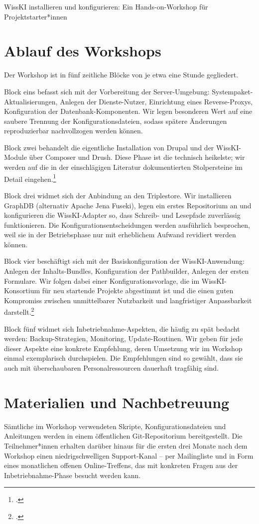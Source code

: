 \begin{beitrag}{WissKI installieren und konfigurieren: Ein Hands-on-Workshop für Projektstarter*innen}
\section{Ablauf des Workshops}
Der Workshop ist in fünf zeitliche Blöcke von je etwa eine Stunde gegliedert.

Block eins befasst sich mit der Vorbereitung der Server-Umgebung: Systempaket-Aktualisierungen, Anlegen der Dienste-Nutzer, Einrichtung eines Reverse-Proxys, Konfiguration der Datenbank-Komponenten. Wir legen besonderen Wert auf eine saubere Trennung der Konfigurationsdateien, sodass spätere Änderungen reproduzierbar nachvollzogen werden können.

Block zwei behandelt die eigentliche Installation von Drupal und der WissKI-Module über Composer und Drush. Diese Phase ist die technisch heikelste; wir werden auf die in der einschlägigen Literatur dokumentierten Stolpersteine im Detail eingehen.\footcite[48]{pohl2024-installation-leitfaden}

Block drei widmet sich der Anbindung an den Triplestore. Wir installieren GraphDB (alternativ Apache Jena Fuseki), legen ein erstes Repositorium an und konfigurieren die WissKI-Adapter so, dass Schreib- und Lesepfade zuverlässig funktionieren. Die Konfigurationsentscheidungen werden ausführlich besprochen, weil sie in der Betriebsphase nur mit erheblichem Aufwand revidiert werden können.

Block vier beschäftigt sich mit der Basiskonfiguration der WissKI-Anwendung: Anlegen der Inhalts-Bundles, Konfiguration der Pathbuilder, Anlegen der ersten Formulare. Wir folgen dabei einer Konfigurationsvorlage, die im WissKI-Konsortium für neu startende Projekte abgestimmt ist und die einen guten Kompromiss zwischen unmittelbarer Nutzbarkeit und langfristiger Anpassbarkeit darstellt.\footcite[vgl.][]{braun2024-konfigurationsvorlage}

Block fünf widmet sich Inbetriebnahme-Aspekten, die häufig zu spät bedacht werden: Backup-Strategien, Monitoring, Update-Routinen. Wir geben für jede dieser Aspekte eine konkrete Empfehlung, deren Umsetzung wir im Workshop einmal exemplarisch durchspielen. Die Empfehlungen sind so gewählt, dass sie auch mit überschaubaren Personalressourcen dauerhaft tragfähig sind.

\section{Materialien und Nachbetreuung}
Sämtliche im Workshop verwendeten Skripte, Konfigurationsdateien und Anleitungen werden in einem öffentlichen Git-Repositorium bereitgestellt. Die Teilnehmer*innen erhalten darüber hinaus für die ersten drei Monate nach dem Workshop einen niedrigschwelligen Support-Kanal -- per Mailingliste und in Form eines monatlichen offenen Online-Treffens, das mit konkreten Fragen aus der Inbetriebnahme-Phase besucht werden kann.


\end{beitrag}

